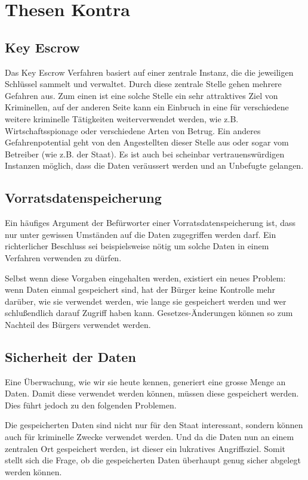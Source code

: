 \section*{Thesen Kontra}

\subsection*{Key Escrow}
Das Key Escrow Verfahren basiert auf einer zentrale Instanz,
die die jeweiligen Schlüssel sammelt und verwaltet.
Durch diese zentrale Stelle gehen mehrere Gefahren aus. Zum einen ist eine
solche Stelle ein sehr attraktives Ziel von Kriminellen, auf der
anderen Seite kann ein Einbruch in eine für verschiedene weitere
kriminelle Tätigkeiten weiterverwendet werden, wie z.B.
Wirtschaftsspionage oder verschiedene Arten von Betrug.
Ein anderes Gefahrenpotential geht von den Angestellten dieser Stelle aus oder
sogar vom Betreiber (wie z.B. der Staat).
Es ist auch bei scheinbar vertrauenswürdigen Instanzen möglich,
dass die Daten veräussert werden und an Unbefugte gelangen.

\subsection*{Vorratsdatenspeicherung}
Ein häufiges Argument der Befürworter einer Vorratsdatenspeicherung ist,
dass nur unter gewissen Umständen auf die Daten zugegriffen werden darf.
Ein richterlicher Beschluss sei beispielsweise nötig um solche Daten
in einem Verfahren verwenden zu dürfen.

Selbst wenn diese Vorgaben eingehalten werden, existiert ein
neues Problem: wenn Daten einmal gespeichert sind, hat der 
Bürger keine Kontrolle mehr darüber, wie sie verwendet werden,
wie lange sie gespeichert werden und wer schlußendlich darauf
Zugriff haben kann. Gesetzes-Änderungen können so zum Nachteil
des Bürgers verwendet werden.

\subsection*{Sicherheit der Daten}
Eine Überwachung, wie wir sie heute kennen, generiert eine grosse Menge an Daten.
Damit diese verwendet werden können, müssen diese gespeichert werden.
Dies führt jedoch zu den folgenden Problemen.

Die gespeicherten Daten sind nicht nur für den Staat interessant,
sondern können auch für kriminelle Zwecke verwendet werden.
Und da die Daten nun an einem zentralen Ort gespeichert werden, ist
dieser ein lukratives Angriffsziel.
Somit stellt sich die Frage, ob die gespeicherten Daten
überhaupt genug sicher abgelegt werden können.

